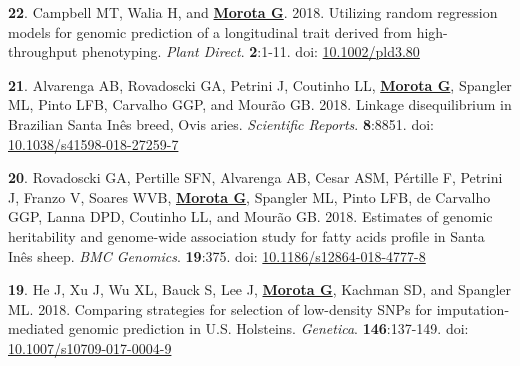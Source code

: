 \documentclass[margin,line,10pt]{res}
\newenvironment{list1}{
  \begin{list}{\ding{113}}{%
      \setlength{\itemsep}{0in}
      \setlength{\parsep}{0in} \setlength{\parskip}{0in}
      \setlength{\topsep}{0in} \setlength{\partopsep}{0in} 
      \setlength{\leftmargin}{0.17in}}}{\end{list}}
\begin{document}
\begin{resume}
\begin{list1}
\item [{\bf 22}.] Campbell MT, Walia H, and \textbf{\underline{Morota G}}. 2018. Utilizing random regression models for genomic prediction of a longitudinal trait derived from high-throughput phenotyping. \emph{Plant Direct}. \textbf{2}:1-11. doi: \textcolor{blue}{\href{https://doi.org/10.1002/pld3.80}{10.1002/pld3.80}} 
  
  \vspace{0.5cm}

\item  [{\bf 21}.] Alvarenga AB, Rovadoscki GA, Petrini J, Coutinho LL, \textbf{\underline{Morota G}}, Spangler ML, Pinto LFB, Carvalho GGP, and Mour{\~a}o GB. 2018. Linkage disequilibrium in Brazilian Santa  In{\^e}s breed, Ovis aries. \emph{Scientific Reports}.  \textbf{8}:8851. doi: \textcolor{blue}{\href{https://doi.org/10.1038/s41598-018-27259-7}{10.1038/s41598-018-27259-7}} 

  \vspace{0.5cm}
  
\item  [{\bf 20}.] Rovadoscki GA, Pertille SFN, Alvarenga AB,  Cesar ASM, P{\'e}rtille F, Petrini J, Franzo V, Soares WVB, \textbf{\underline{Morota G}}, Spangler ML, Pinto LFB, de Carvalho GGP, Lanna DPD, Coutinho LL, and Mour{\~a}o GB. 2018. Estimates of genomic heritability and genome-wide association study for fatty acids profile in Santa In{\^e}s sheep. \emph{BMC Genomics}. \textbf{19}:375. doi: \textcolor{blue}{\href{https://doi.org/10.1186/s12864-018-4777-8}{10.1186/s12864-018-4777-8}} 
    
    \vspace{0.5cm}
  
\item  [{\bf 19}.] He J, Xu J, Wu XL, Bauck S, Lee J, \textbf{\underline{Morota G}}, Kachman SD, and Spangler ML. 2018. Comparing strategies for selection of low-density SNPs for imputation-mediated genomic prediction in U.S. Holsteins. \emph{Genetica}. \textbf{146}:137-149. doi: \textcolor{blue}{\href{https://dx.doi.org/10.1007/s10709-017-0004-9}{10.1007/s10709-017-0004-9}}

\end{list1}


\section{}

\begin{list1}


\end{list1}
\end{resume}
\end{document}
